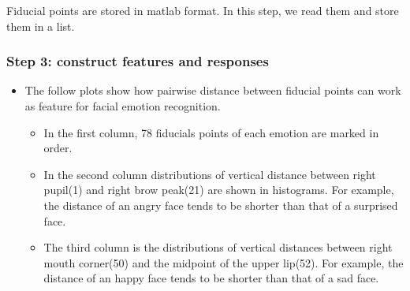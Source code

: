 \documentclass[
]{article}
\newenvironment{Shaded}{\begin{snugshade}}{\end{snugshade}}
\newcommand{\CommentTok}[1]{\textcolor[rgb]{0.56,0.35,0.01}{\textit{#1}}}
\newcommand{\ControlFlowTok}[1]{\textcolor[rgb]{0.13,0.29,0.53}{\textbf{#1}}}
\newcommand{\DataTypeTok}[1]{\textcolor[rgb]{0.13,0.29,0.53}{#1}}
\newcommand{\DecValTok}[1]{\textcolor[rgb]{0.00,0.00,0.81}{#1}}
\newcommand{\KeywordTok}[1]{\textcolor[rgb]{0.13,0.29,0.53}{\textbf{#1}}}
\newcommand{\NormalTok}[1]{#1}
\newcommand{\OperatorTok}[1]{\textcolor[rgb]{0.81,0.36,0.00}{\textbf{#1}}}
\newcommand{\StringTok}[1]{\textcolor[rgb]{0.31,0.60,0.02}{#1}}
\providecommand{\tightlist}{%
  \setlength{\itemsep}{0pt}\setlength{\parskip}{0pt}}
\begin{document}
Fiducial points are stored in matlab format. In this step, we read them
and store them in a list.

\begin{Shaded}
\end{Shaded}

\hypertarget{step-3-construct-features-and-responses}{%
\subsubsection{Step 3: construct features and
responses}\label{step-3-construct-features-and-responses}}

\begin{itemize}
\item
  The follow plots show how pairwise distance between fiducial points
  can work as feature for facial emotion recognition.

  \begin{itemize}
  \tightlist
  \item
    In the first column, 78 fiducials points of each emotion are marked
    in order.
  \item
    In the second column distributions of vertical distance between
    right pupil(1) and right brow peak(21) are shown in histograms. For
    example, the distance of an angry face tends to be shorter than that
    of a surprised face.
  \item
    The third column is the distributions of vertical distances between
    right mouth corner(50) and the midpoint of the upper lip(52). For
    example, the distance of an happy face tends to be shorter than that
    of a sad face.
  \end{itemize}
\end{itemize}
\end{document}
